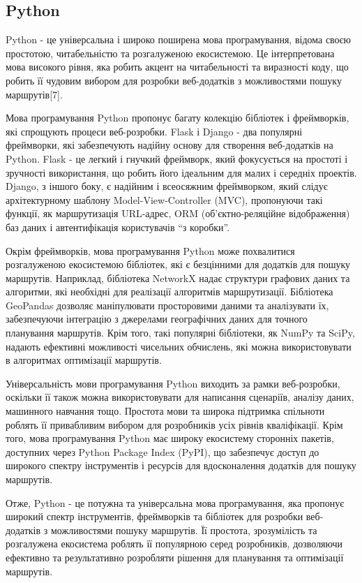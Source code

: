 \subsection{Python}
\label{subsec:python-subsection}

Python - це універсальна і широко поширена мова програмування, відома своєю простотою, читабельністю та розгалуженою екосистемою. Це інтерпретована мова високого рівня, яка робить акцент на читабельності та виразності коду, що робить її чудовим вибором для розробки веб-додатків з можливостями пошуку маршрутів[7].

Мова програмування Python пропонує багату колекцію бібліотек і фреймворків, які спрощують процеси веб-розробки. Flask і Django - два популярні фреймворки, які забезпечують надійну основу для створення веб-додатків на Python. Flask - це легкий і гнучкий фреймворк, який фокусується на простоті і зручності використання, що робить його ідеальним для малих і середніх проектів. Django, з іншого боку, є надійним і всеосяжним фреймворком, який слідує архітектурному шаблону Model-View-Controller (MVC), пропонуючи такі функції, як маршрутизація URL-адрес, ORM (об'єктно-реляційне відображення) баз даних і автентифікація користувачів ``з коробки''.

Окрім фреймворків, мова програмування Python може похвалитися розгалуженою екосистемою бібліотек, які є безцінними для додатків для пошуку маршрутів. Наприклад, бібліотека NetworkX надає структури графових даних та алгоритми, які необхідні для реалізації алгоритмів маршрутизації. Бібліотека GeoPandas дозволяє маніпулювати просторовими даними та аналізувати їх, забезпечуючи інтеграцію з джерелами географічних даних для точного планування маршрутів. Крім того, такі популярні бібліотеки, як NumPy та SciPy, надають ефективні можливості чисельних обчислень, які можна використовувати в алгоритмах оптимізації маршрутів.

Універсальність мови програмування Python виходить за рамки веб-розробки, оскільки її також можна використовувати для написання сценаріїв, аналізу даних, машинного навчання тощо. Простота мови та широка підтримка спільноти роблять її привабливим вибором для розробників усіх рівнів кваліфікації. Крім того, мова програмування Python має широку екосистему сторонніх пакетів, доступних через Python Package Index (PyPI), що забезпечує доступ до широкого спектру інструментів і ресурсів для вдосконалення додатків для пошуку маршрутів.

Отже, Python - це потужна та універсальна мова програмування, яка пропонує широкий спектр інструментів, фреймворків та бібліотек для розробки веб-додатків з можливостями пошуку маршрутів. Її простота, зрозумілість та розгалужена екосистема роблять її популярною серед розробників, дозволяючи ефективно та результативно розробляти рішення для планування та оптимізації маршрутів.

